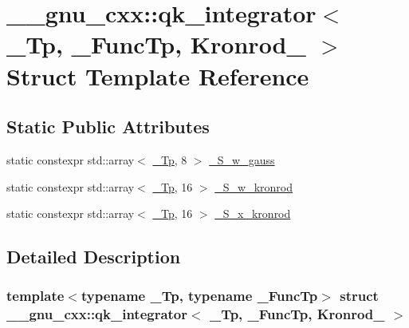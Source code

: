 \hypertarget{struct____gnu__cxx_1_1qk__integrator_3_01__Tp_00_01__FuncTp_00_01Kronrod__31_01_4}{}\section{\+\_\+\+\_\+gnu\+\_\+cxx\+:\+:qk\+\_\+integrator$<$ \+\_\+\+Tp, \+\_\+\+Func\+Tp, Kronrod\+\_ $>$ Struct Template Reference}
\label{struct____gnu__cxx_1_1qk__integrator_3_01__Tp_00_01__FuncTp_00_01Kronrod__31_01_4}
\subsection*{Static Public Attributes}
\begin{DoxyCompactItemize}
\item 
static constexpr std\+::array$<$ \hyperlink{namespace____gnu__cxx_a3b19a9c800ca194374ef9172290f7d79}{\+\_\+\+Tp}, 8 $>$ \hyperlink{struct____gnu__cxx_1_1qk__integrator_3_01__Tp_00_01__FuncTp_00_01Kronrod__31_01_4_a3c8884639349c6d5e61005e36dcdb35b}{\+\_\+\+S\+\_\+w\+\_\+gauss}
\item 
static constexpr std\+::array$<$ \hyperlink{namespace____gnu__cxx_a3b19a9c800ca194374ef9172290f7d79}{\+\_\+\+Tp}, 16 $>$ \hyperlink{struct____gnu__cxx_1_1qk__integrator_3_01__Tp_00_01__FuncTp_00_01Kronrod__31_01_4_a00ea863b8b8adad619408d13428239a8}{\+\_\+\+S\+\_\+w\+\_\+kronrod}
\item 
static constexpr std\+::array$<$ \hyperlink{namespace____gnu__cxx_a3b19a9c800ca194374ef9172290f7d79}{\+\_\+\+Tp}, 16 $>$ \hyperlink{struct____gnu__cxx_1_1qk__integrator_3_01__Tp_00_01__FuncTp_00_01Kronrod__31_01_4_a69f1e7a6d85fcb57cd868436160040ac}{\+\_\+\+S\+\_\+x\+\_\+kronrod}
\end{DoxyCompactItemize}


\subsection{Detailed Description}
\subsubsection*{template$<$typename \+\_\+\+Tp, typename \+\_\+\+Func\+Tp$>$\newline
struct \+\_\+\+\_\+gnu\+\_\+cxx\+::qk\+\_\+integrator$<$ \+\_\+\+Tp, \+\_\+\+Func\+Tp, Kronrod\+\_ $>$}

